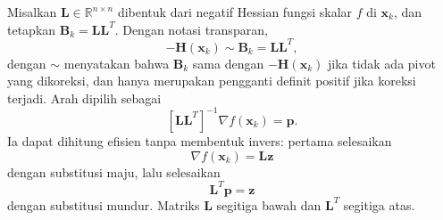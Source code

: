 \begin{cgalgorithm}[htbp]
\noindent{}
\caption{Cholesky termodifikasi menghasilkan pengganti definit positif; kedekatannya terhadap matriks masukan bergantung pada koreksi pivot.}
\label{alg:ModifiedCholesky}
\end{cgalgorithm}

\begin{remark} Misalkan $\mathbf{L}\in\mathbb{R}^{n\times n}$ dibentuk dari negatif Hessian fungsi skalar $f$ di $\mathbf{x}_k$, dan tetapkan $\mathbf{B}_k=\mathbf{L}\mathbf{L}^T$. Dengan notasi transparan,
\begin{equation}
-\mathbf{H}(\mathbf{x}_k)\sim\mathbf{B}_k=\mathbf{L}\mathbf{L}^T,
\end{equation}
dengan $\sim$ menyatakan bahwa $\mathbf{B}_k$ sama dengan $-\mathbf{H}(\mathbf{x}_k)$ jika tidak ada pivot yang dikoreksi, dan hanya merupakan pengganti definit positif jika koreksi terjadi. Arah dipilih sebagai
\begin{equation}
\left[\mathbf{L}\mathbf{L}^T\right]^{-1}\nabla f(\mathbf{x}_k)=\mathbf{p}.
\end{equation}
Ia dapat dihitung efisien tanpa membentuk invers: pertama selesaikan
\begin{equation}
\nabla f(\mathbf{x}_k)=\mathbf{L}\mathbf{z}
\end{equation}
dengan substitusi maju, lalu selesaikan
\begin{equation}
\mathbf{L}^T\mathbf{p}=\mathbf{z}
\end{equation}
dengan substitusi mundur. Matriks $\mathbf{L}$ segitiga bawah dan $\mathbf{L}^T$ segitiga atas.
\end{remark}

